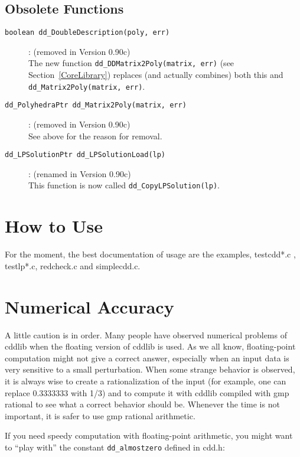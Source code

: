 \documentclass[11pt]{article}
\newcommand {\0} {{\bf 0}}
\begin{document}
\subsection{Obsolete Functions}  \label{ObsoleteFunctions}
\begin{description}
\item[{\tt boolean dd\_DoubleDescription(poly, err)}]: 
(removed in Version 0.90c)\\
The new function
{\tt dd\_DDMatrix2Poly(matrix, err)} (see Section~\ref{CoreLibrary}) 
replaces (and actually combines) both this and 
{\tt dd\_Matrix2Poly(matrix, err)}.

\item[{\tt dd\_PolyhedraPtr dd\_Matrix2Poly(matrix, err)}]: 
(removed in Version 0.90c)\\
See above for the reason for removal.

\item[{\tt dd\_LPSolutionPtr dd\_LPSolutionLoad(lp)}]:
(renamed in Version 0.90c)\\
This function is now called {\tt dd\_CopyLPSolution(lp)}.

\end{description}

\section{How to Use}  \label{HOWTO}

For the moment, the best documentation of usage are 
the examples, testcdd*.c , testlp*.c, redcheck.c
and simplecdd.c.

\section{Numerical Accuracy}  \label{accuracy}
 A little caution is in order.  Many people have observed 
numerical problems of cddlib when the floating version of cddlib
is used.   As we all know, floating-point computation
might not give a correct answer, especially when an input
data is very sensitive to a small perturbation.  When
some strange behavior is observed, it is always wise
to create a rationalization of the input
(for example, one can replace 0.3333333 with 1/3)
and to compute it with cddlib compiled with gmp rational
to see what a correct behavior should be.  Whenever the time
is not important, it is safer to use gmp rational arithmetic.

If you need speedy computation with floating-point arithmetic,
you might want to ``play with'' the constant {\tt dd\_almostzero} 
defined in cdd.h:
\end{document}
